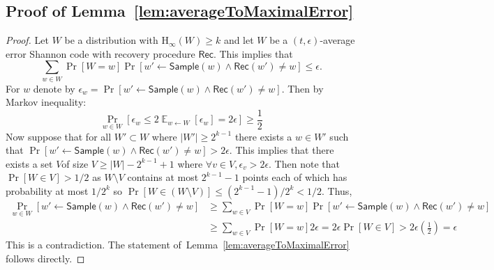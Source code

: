 \documentclass[11pt]{article}
\newcommand{\lemref}[1]{\mbox{Lemma~\ref{#1}}}
\DeclareMathOperator*{\expe}{\mathbb{E}}
\newcommand{\class}[1]{{\ensuremath{\mathsf{#1}}}}
\newcommand{\rec}{\ensuremath{\class{Rec}}\xspace}
\newcommand{\sample}{\ensuremath{\class{Sample}}\xspace}
\newcommand{\Hoo}{\mathrm{H}_\infty}
\begin{document}
\subsection{Proof of \lemref{lem:averageToMaximalError}}
\label{sec:proof of average to maximal error}
\begin{proof}
Let $W$ be a distribution with $\Hoo(W)\geq k$ and let $W$ be a  $(t,\epsilon)$-average error Shannon code with recovery procedure $\rec$.  This implies that 
\[
\sum_{w\in W} \Pr[W=w]\Pr[ w'\leftarrow \sample (w) \wedge \rec(w') \neq w]\leq \epsilon.
\]
For $w$ denote by $\epsilon_w = \Pr[w'\leftarrow \sample(w) \wedge \rec(w') \neq w]$.  Then by Markov inequality:
\[
\Pr_{w\in W}[ \epsilon_w \leq 2\expe_{w\leftarrow W} [\epsilon_w ] = 2\epsilon]\geq \frac{1}{2}
\]
Now suppose that for all $W'\subset W$ where $|W'|\geq 2^{k-1}$ there exists a $w\in W'$ such that $\Pr[ w'\leftarrow \sample (w) \wedge \rec(w') \neq w]> 2\epsilon$.  This implies that there exists a set $V$of size $V\geq |W|-2^{k-1}+1$ where $\forall v\in V, \epsilon_v >2\epsilon$.  Then note that $\Pr[W\in V]> 1/2$ as $W\setminus V$ contains at most $2^{k-1}-1$ points each of which has probability at most $1/2^k$ so $\Pr[W\in (W\setminus V)]\leq (2^{k-1}-1)/2^k < 1/2$.  Thus,
\begin{align*}
\Pr_{w\in W}[ w'\leftarrow \sample (w) \wedge \rec(w') \neq w]&\geq \sum_{w\in V}  \Pr[W=w]\Pr[ w'\leftarrow \sample (w) \wedge \rec(w') \neq w]\\
&\geq \sum_{w\in V} \Pr[W=w] 2\epsilon   = 2\epsilon \Pr[W\in V]> 2\epsilon\left(\frac{1}{2}\right)= \epsilon
\end{align*}
This is a contradiction.  The statement of~\lemref{lem:averageToMaximalError} follows directly.
\end{proof}
\end{document}
